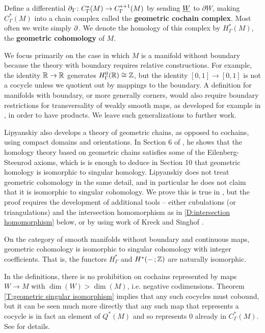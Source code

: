 \begin{definition}
	Define a differential $\operatorname{\partial}_\Gamma \colon C_\Gamma^*(M) \to C_\Gamma^{*+1}(M)$ by sending $\underline{W}$ to $ \underline{\partial W}$, making $C_\Gamma^*(M)$ into a chain complex called the {\bf geometric cochain complex}.
	Most often we write simply $\operatorname{\partial}$.
	We denote the homology of this complex by $H^*_\Gamma(M)$, the \textbf{geometric cohomology} of $M$.
\end{definition}

We focus primarily on the case in which $M$ is a manifold without boundary because
the theory with boundary requires relative constructions.
For example, the identity $\mathbb{R}\to\mathbb{R}$ generates $H_\Gamma^0(\mathbb{R})\cong \mathbb{Z}$, but the identity $[0,1] \to [0,1]$ is not a cocycle unless we quotient out by mappings to the boundary.
A definition for manifolds with boundary, or more generally corners, would also require boundary restrictions for transversality of weakly smooth maps, as developed for example in \cite{Joy12}, in order to have products.
We leave such generalizations to further work.

Lipyanskiy also develops a theory of geometric chains, as opposed to cochains, using compact domains and orientations.
In Section 6 of \cite{Lipy14}, he shows that the homology theory based on geometric chains satisfies some of the Eilenberg-Steenrod axioms, which is is enough to deduce in Section 10 that geometric homology is isomorphic to singular homology.
Lipyanskiy does not treat geometric cohomology in the same detail, and in particular he does not claim that it is isomorphic to singular cohomology.
We prove this is true in \cite[Theorem 5.34 and Theorem 6.21]{medina2022foundations}, but the proof requires the development of additional tools -- either cubulations (or triangulations) and the
intersection homomorphism as in \cref{D:intersection homomorphism} below, or by using work of Kreck and Singhof \cite{Krec10, Krec10b}.

\begin{theorem}\label{T:geometric singular isomorphism}
	On the category of smooth manifolds without boundary and continuous maps, geometric cohomology is isomorphic to singular cohomology with integer coefficients.
	That is, the functors $H^*_\Gamma$ and $H^*(- \,;\mathbb{Z})$ are naturally isomorphic.
\end{theorem}

\begin{remark}
	In the definitions, there is no prohibition on cochains represented by maps $W \to M$ with $\dim(W) > \dim(M)$, i.e. negative codimensions.
	Theorem \cref{T:geometric singular isomorphism} implies that any such cocycles must cobound, but it can be seen much more directly that any such map that represents a cocycle is in fact an element of $Q^*(M)$ and so represents $0$ already in $C^*_\Gamma(M)$.
	See \cite[Example 4.23]{medina2022foundations} for details.
\end{remark}


